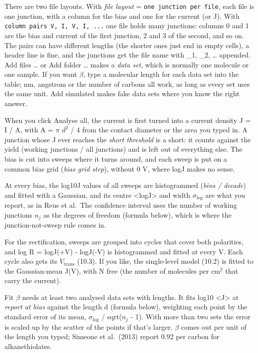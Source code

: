 \documentclass[
  11pt,
  a4paper,
]{article}
\begin{document}
There are two file layouts. With \emph{file layout} =
\texttt{one junction per file}, each file is one junction, with a column
for the bias and one for the current (or J). With
\texttt{column pairs V, I, V, I, ...} one file holds many junctions:
columns 0 and 1 are the bias and current of the first junction, 2 and 3
of the second, and so on. The pairs can have different lengths (the
shorter ones just end in empty cells), a header line is fine, and the
junctions get the file name with \_1, \_2, \ldots{} appended. Add files
\ldots{} or Add folder \ldots{} makes a \emph{data set}, which is
normally one molecule or one sample. If you want $\beta$, type a
molecular length for each data set into the table; nm, angstrom or the
number of carbons all work, as long as every set uses the same unit. Add
simulated makes fake data sets where you know the right answer.

When you click Analyse all, the current is first turned into a current
density J = I / A, with A = $\pi$ $d^{2}$ / 4 from the contact diameter
or the area you typed in. A junction whose \textbar J\textbar{} ever
reaches the \emph{short threshold} is a short: it counts against the
yield (working junctions / all junctions) and is left out of everything
else. The bias is cut into sweeps where it turns around, and each sweep
is put on a common bias grid (\emph{bias grid step}), without 0 V, where
log\textbar J\textbar{} makes no sense.

At every bias, the log10\textbar J\textbar{} values of all sweeps are
histogrammed (\emph{bins / decade}) and fitted with a Gaussian, and its
centre \textless log\textbar J\textbar\textgreater{} and width
$\sigma_\mathrm{log}$ are what you report, as in Reus et al.~The
confidence interval uses the number of working junctions $n_j$ as the
degrees of freedom (formula below), which is where the
junction-not-sweep rule comes in.

For the rectification, sweeps are grouped into cycles that cover both
polarities, and log R = log\textbar J(+V)\textbar{} -
log\textbar J(-V)\textbar{} is histogrammed and fitted at every
\textbar V\textbar. Each cycle also gets its $V_\mathrm{trans}$ (10.3).
If you like, the single-level model (10.2) is fitted to the
Gaussian-mean J(V), with N free (the number of molecules per cm$^2$ that
carry the current).

Fit $\beta$ needs at least two analysed data sets with lengths. It fits
log10 \textless\textbar J\textbar\textgreater{} at \emph{report at bias}
against the length d (formula below), weighting each point by the
standard error of its mean, $\sigma_\mathrm{log}$ / sqrt($n_j$ - 1).
With more than two sets the error is scaled up by the scatter of the
points if that's larger. $\beta$ comes out per unit of the length you
typed; Simeone et al.~(2013) report 0.92 per carbon for alkanethiolates.
\end{document}
